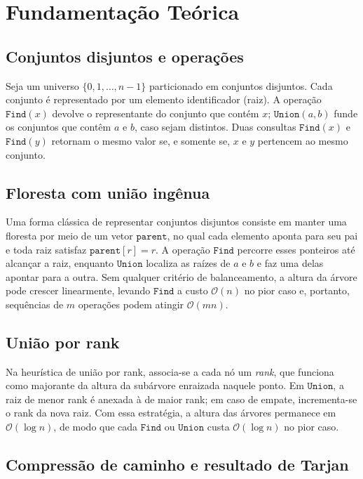 \section{Fundamentação Teórica}
\label{sec:fundamentacao}

\subsection{Conjuntos disjuntos e operações}

Seja um universo $\{0,1,\ldots,n-1\}$ particionado em conjuntos disjuntos. Cada conjunto é representado por um elemento identificador (raiz). A operação $\texttt{Find}(x)$ devolve o representante do conjunto que contém $x$; $\texttt{Union}(a,b)$ funde os conjuntos que contêm $a$ e $b$, caso sejam distintos. Duas consultas $\texttt{Find}(x)$ e $\texttt{Find}(y)$ retornam o mesmo valor se, e somente se, $x$ e $y$ pertencem ao mesmo conjunto.

\subsection{Floresta com união ingênua}

Uma forma clássica de representar conjuntos disjuntos consiste em manter uma floresta por meio de um vetor $\texttt{parent}$, no qual cada elemento aponta para seu pai e toda raiz satisfaz $\texttt{parent}[r]=r$. A operação $\texttt{Find}$ percorre esses ponteiros até alcançar a raiz, enquanto $\texttt{Union}$ localiza as raízes de $a$ e $b$ e faz uma delas apontar para a outra. Sem qualquer critério de balanceamento, a altura da árvore pode crescer linearmente, levando $\texttt{Find}$ a custo $\mathcal{O}(n)$ no pior caso e, portanto, sequências de $m$ operações podem atingir $\mathcal{O}(mn)$.

\subsection{União por rank}

Na heurística de união por rank, associa-se a cada nó um \emph{rank}, que funciona como majorante da altura da subárvore enraizada naquele ponto. Em $\texttt{Union}$, a raiz de menor rank é anexada à de maior rank; em caso de empate, incrementa-se o rank da nova raiz. Com essa estratégia, a altura das árvores permanece em $\mathcal{O}(\log n)$, de modo que cada $\texttt{Find}$ ou $\texttt{Union}$ custa $\mathcal{O}(\log n)$ no pior caso.

\subsection{Compressão de caminho e resultado de Tarjan}

